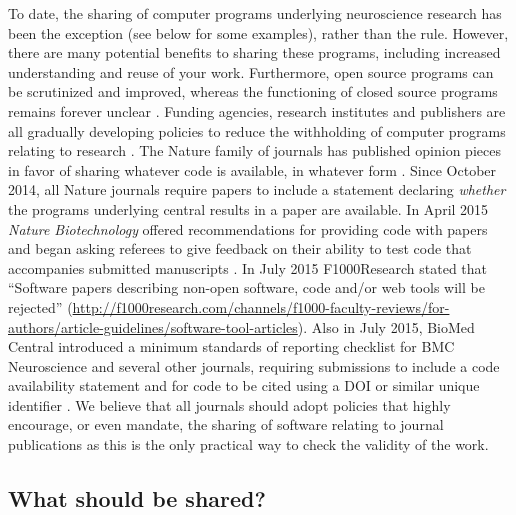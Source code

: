 \documentclass[11pt]{article}
\begin{document}
To date, the sharing of computer programs underlying neuroscience
research has been the exception (see below for some examples), rather
than the rule.  However, there are many potential benefits to sharing
these programs, including increased understanding and reuse of your
work.  Furthermore, open source programs can be scrutinized and
improved, whereas the functioning of closed source programs remains
forever unclear \cite{Vihinen2015}.  Funding agencies, research
institutes and publishers are all gradually developing policies to
reduce the withholding of computer programs relating to research
\cite{Morin2012-65e}.  The Nature family of journals has published
opinion pieces in favor of sharing whatever code is available, in
whatever form \cite{Barnes2010-iv,Ince2012-225}.  Since October 2014,
all Nature journals require papers to include a statement declaring
\textit{whether} the programs underlying central results in a paper
are available. In April 2015 \textit{Nature Biotechnology} offered
recommendations for providing code with papers and began asking
referees to give feedback on their ability to test code that
accompanies submitted manuscripts \cite{NatBiotech2015}.  In July 2015
F1000Research stated that ``Software papers describing non-open
software, code and/or web tools will be rejected''
(\url{http://f1000research.com/channels/f1000-faculty-reviews/for-authors/article-guidelines/software-tool-articles}). Also
in July 2015, BioMed Central introduced a minimum standards of
reporting checklist for BMC Neuroscience and several other journals,
requiring submissions to include a code availability statement and for
code to be cited using a DOI or similar unique identifier
\cite{Kenall2015}.  We believe that all journals should adopt policies
that highly encourage, or even mandate, the sharing of software
relating to journal publications as this is the only practical way to
check the validity of the work.


\subsection*{What should be shared?}
\end{document}
